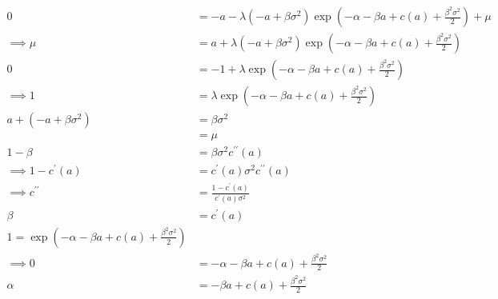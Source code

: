 \begin{enumerate}[label=\alph*)]
\begin{align*}
    0 &= -a - \lambda(-a + \beta \sigma^2) \exp\left(- \alpha - \beta a + c(a) + \frac{\beta^2 \sigma^2}{2}\right) + \mu \tag{$\beta$} \\
    \implies \mu &= a + \lambda(-a + \beta \sigma^2) \exp\left(- \alpha - \beta a + c(a) + \frac{\beta^2 \sigma^2}{2}\right)\\
    0 &= -1 + \lambda \exp \left(- \alpha - \beta a + c(a) + \frac{\beta^2 \sigma^2}{2}\right) \tag{$\alpha$}\\
    \implies 1 &= \lambda \exp \left(- \alpha  - \beta a + c(a) + \frac{\beta^2 \sigma^2}{2}\right)\\
    a + (-a + \beta \sigma^2) &= \beta \sigma^2\\
                                                            &= \mu\\
    1 - \beta &= \beta \sigma^2 c^{\prime \prime}(a)\\
    \implies 1 - c^\prime (a) &= c^\prime (a) \sigma^2 c^{\prime \prime} (a)\\
    \implies c^{\prime \prime} &= \frac{1 - c^\prime (a)}{c^\prime (a) \sigma^2}\\
    \beta &= c^\prime (a)\\
    1 = \exp \left(- \alpha - \beta a + c(a) + \frac{\beta^2 \sigma^2}{2}\right)\\
    \implies 0 &= - \alpha - \beta a + c(a) + \frac{\beta^2 \sigma^2}{2}\\
    \alpha &= -\beta a + c(a) + \frac{\beta^2 \sigma^2}{2}
  \end{align*}
\end{enumerate}
